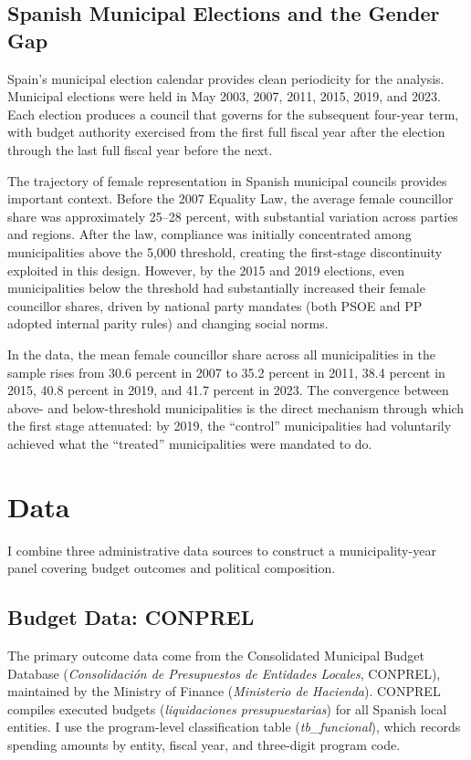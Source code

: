 \documentclass[12pt]{article}
\begin{document}
\subsection{Spanish Municipal Elections and the Gender Gap}

Spain's municipal election calendar provides clean periodicity for the analysis. Municipal elections were held in May 2003, 2007, 2011, 2015, 2019, and 2023. Each election produces a council that governs for the subsequent four-year term, with budget authority exercised from the first full fiscal year after the election through the last full fiscal year before the next.

The trajectory of female representation in Spanish municipal councils provides important context. Before the 2007 Equality Law, the average female councillor share was approximately 25--28 percent, with substantial variation across parties and regions. After the law, compliance was initially concentrated among municipalities above the 5,000 threshold, creating the first-stage discontinuity exploited in this design. However, by the 2015 and 2019 elections, even municipalities below the threshold had substantially increased their female councillor shares, driven by national party mandates (both PSOE and PP adopted internal parity rules) and changing social norms.

In the data, the mean female councillor share across all municipalities in the sample rises from 30.6 percent in 2007 to 35.2 percent in 2011, 38.4 percent in 2015, 40.8 percent in 2019, and 41.7 percent in 2023. The convergence between above- and below-threshold municipalities is the direct mechanism through which the first stage attenuated: by 2019, the ``control'' municipalities had voluntarily achieved what the ``treated'' municipalities were mandated to do.


\section{Data}

I combine three administrative data sources to construct a municipality-year panel covering budget outcomes and political composition.

\subsection{Budget Data: CONPREL}

The primary outcome data come from the Consolidated Municipal Budget Database (\emph{Consolidaci\'{o}n de Presupuestos de Entidades Locales}, CONPREL), maintained by the Ministry of Finance (\emph{Ministerio de Hacienda}). CONPREL compiles executed budgets (\emph{liquidaciones presupuestarias}) for all Spanish local entities. I use the program-level classification table (\emph{tb\_funcional}), which records spending amounts by entity, fiscal year, and three-digit program code.
\end{document}
